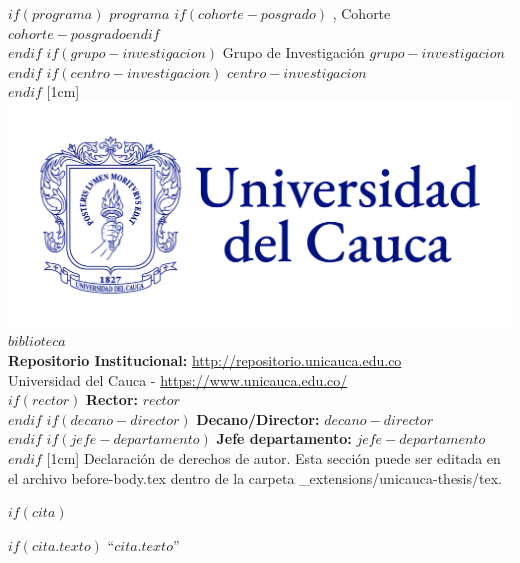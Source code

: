 \vspace{1cm}
$if(programa)$
\noindent
{$programa$ $if(cohorte-posgrado)$ {, Cohorte $cohorte-posgrado$}$endif$}\\
$endif$
$if(grupo-investigacion)$
\noindent
{Grupo de Investigación $grupo-investigacion$}\\
$endif$
$if(centro-investigacion)$
\noindent
{$centro-investigacion$}\\
$endif$
%
[1cm]
%
\includegraphics{assets/unicauca_horizontal.png}\quad
{$biblioteca$}\\[1cm]
%
{\textbf{Repositorio Institucional:} \url{http://repositorio.unicauca.edu.co}}\\[1cm]
{Universidad del Cauca - \url{https://www.unicauca.edu.co/}}\\[0.5cm]
%
$if(rector)$
{\textbf{Rector:} $rector$}\\
$endif$
$if(decano-director)$
{\textbf{Decano/Director:} $decano-director$}\\
$endif$
$if(jefe-departamento)$
{\textbf{Jefe departamento:} $jefe-departamento$}\\
$endif$
%
[1cm]
Declaración de derechos de autor. Esta sección puede ser editada en el archivo before-body.tex dentro de la carpeta _extensions/unicauca-thesis/tex. 

\newpage


$if(cita)$

\thispagestyle{empty}

\vspace*{0.2\textheight}

$if(cita.texto)$
\noindent``{\itshape $cita.texto$}''\bigbreak

